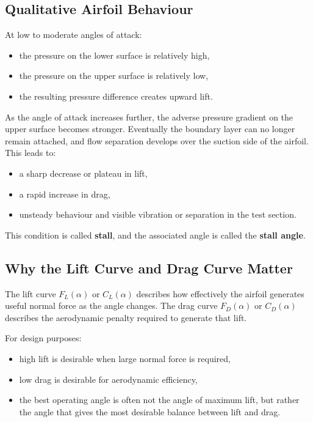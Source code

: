 \documentclass[12pt,letterpaper]{article}
\begin{document}
\subsection{Qualitative Airfoil Behaviour}
At low to moderate angles of attack:
\begin{itemize}[leftmargin=*]
    \item the pressure on the lower surface is relatively high,
    \item the pressure on the upper surface is relatively low,
    \item the resulting pressure difference creates upward lift.
\end{itemize}

As the angle of attack increases further, the adverse pressure gradient on the upper surface becomes stronger. Eventually the boundary layer can no longer remain attached, and flow separation develops over the suction side of the airfoil. This leads to:
\begin{itemize}[leftmargin=*]
    \item a sharp decrease or plateau in lift,
    \item a rapid increase in drag,
    \item unsteady behaviour and visible vibration or separation in the test section.
\end{itemize}

This condition is called \textbf{stall}, and the associated angle is called the \textbf{stall angle}.

\subsection{Why the Lift Curve and Drag Curve Matter}
The lift curve \(F_L(\alpha)\) or \(C_L(\alpha)\) describes how effectively the airfoil generates useful normal force as the angle changes. The drag curve \(F_D(\alpha)\) or \(C_D(\alpha)\) describes the aerodynamic penalty required to generate that lift.

For design purposes:
\begin{itemize}[leftmargin=*]
    \item high lift is desirable when large normal force is required,
    \item low drag is desirable for aerodynamic efficiency,
    \item the best operating angle is often not the angle of maximum lift, but rather the angle that gives the most desirable balance between lift and drag.
\end{itemize}
\end{document}
